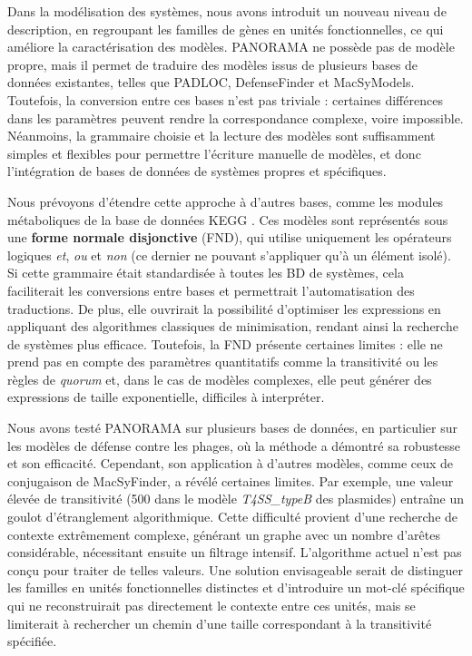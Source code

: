 Dans la modélisation des systèmes, nous avons introduit un nouveau niveau de description, en regroupant les familles de gènes en unités fonctionnelles, ce qui améliore la caractérisation des modèles. PANORAMA ne possède pas de modèle propre, mais il permet de traduire des modèles issus de plusieurs bases de données existantes, telles que PADLOC, DefenseFinder et MacSyModels. Toutefois, la conversion entre ces bases n’est pas triviale : certaines différences dans les paramètres peuvent rendre la correspondance complexe, voire impossible. Néanmoins, la grammaire choisie et la lecture des modèles sont suffisamment simples et flexibles pour permettre l'écriture manuelle de modèles, et donc l'intégration de bases de données de systèmes propres et spécifiques. 

Nous prévoyons d’étendre cette approche à d’autres bases, comme les modules métaboliques de la base de données KEGG \cite{kanehisa_kegg_2025}. Ces modèles sont représentés sous une \textbf{forme normale disjonctive} (FND), qui utilise uniquement les opérateurs logiques \textit{et}, \textit{ou} et \textit{non} (ce dernier ne pouvant s’appliquer qu’à un élément isolé). Si cette grammaire était standardisée à toutes les BD de systèmes, cela faciliterait les conversions entre bases et permettrait l’automatisation des traductions. De plus, elle ouvrirait la possibilité d’optimiser les expressions en appliquant des algorithmes classiques de minimisation, rendant ainsi la recherche de systèmes plus efficace. Toutefois, la FND présente certaines limites : elle ne prend pas en compte des paramètres quantitatifs comme la transitivité ou les règles de \textit{quorum} et, dans le cas de modèles complexes, elle peut générer des expressions de taille exponentielle, difficiles à interpréter.

\newpage

Nous avons testé PANORAMA sur plusieurs bases de données, en particulier sur les modèles de défense contre les phages, où la méthode a démontré sa robustesse et son efficacité. Cependant, son application à d’autres modèles, comme ceux de conjugaison de MacSyFinder, a révélé certaines limites. Par exemple, une valeur élevée de transitivité (500 dans le modèle \textit{T4SS\_typeB} des plasmides) entraîne un goulot d’étranglement algorithmique. Cette difficulté provient d’une recherche de contexte extrêmement complexe, générant un graphe avec un nombre d’arêtes considérable, nécessitant ensuite un filtrage intensif. L’algorithme actuel n’est pas conçu pour traiter de telles valeurs. Une solution envisageable serait de distinguer les familles en unités fonctionnelles distinctes et d’introduire un mot-clé spécifique qui ne reconstruirait pas directement le contexte entre ces unités, mais se limiterait à rechercher un chemin d’une taille correspondant à la transitivité spécifiée.

